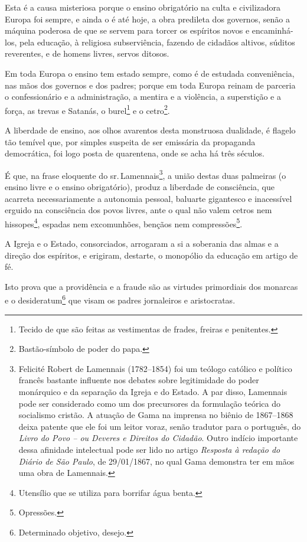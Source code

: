 Esta é a causa misteriosa porque o ensino obrigatório na culta e
civilizadora Europa foi sempre, e ainda o é até hoje, a obra predileta
dos governos, senão a máquina poderosa de que se servem para torcer os
espíritos novos e encaminhá-los, pela educação, à religiosa
subserviência, fazendo de cidadãos altivos, súditos reverentes, e de
homens livres, servos ditosos.

Em toda Europa o ensino tem estado sempre, como é de estudada
conveniência, nas mãos dos governos e dos padres; porque em toda Europa
reinam de parceria o confessionário e a administração, a mentira e a
violência, a superstição e a força, as trevas e Satanás, o
burel\footnote{Tecido de que são feitas as vestimentas de frades,
  freiras e penitentes.} e o cetro\footnote{Bastão-símbolo de poder do
  papa.}.

A liberdade de ensino, aos olhos avarentos desta monstruosa dualidade, é
flagelo tão temível que, por simples suspeita de ser emissária da
propaganda democrática, foi logo posta de quarentena, onde se acha há
três séculos.

É que, na frase eloquente do sr.\,Lamennais\footnote{Felicité Robert de
  Lamennais (1782--1854) foi um teólogo católico e político francês
  bastante influente nos debates sobre legitimidade do poder monárquico
  e da separação da Igreja e do Estado. A par disso, Lamennais pode ser
  considerado como um dos precursores da formulação teórica do
  socialismo cristão. A atuação de Gama na imprensa no biênio de
  1867--1868 deixa patente que ele foi um leitor voraz, senão tradutor
  para o português, do \emph{Livro do Povo -- ou Deveres e Direitos do
  Cidadão}. Outro indício importante dessa afinidade intelectual pode
  ser lido no artigo \emph{Resposta à redação do Diário de São Paulo}, de
  29/01/1867, no qual Gama demonstra ter em mãos uma obra de Lamennais.},
a união destas duas palmeiras (o ensino livre e o ensino obrigatório),
produz a liberdade de consciência, que acarreta necessariamente a
autonomia pessoal, baluarte gigantesco e inacessível erguido na
consciência dos povos livres, ante o qual não valem cetros nem
hissopes\footnote{Utensílio que se utiliza para borrifar água benta.},
espadas nem excomunhões, bençãos nem compressões\footnote{Opressões.}.

A Igreja e o Estado, consorciados, arrogaram a si a soberania das almas
e a direção dos espíritos, e erigiram, destarte, o monopólio da educação
em artigo de fé.

Isto prova que a providência e a fraude são as virtudes primordiais dos
monarcas e o desideratum\footnote{Determinado objetivo, desejo.} que
visam os padres jornaleiros e aristocratas.

